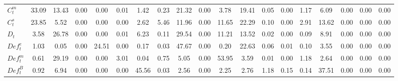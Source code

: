\begin{center}
\begin{longtable}{lcccccccccccccccccc}
$ C^m_t             $	 & 	            33.09	 & 	            13.43	 & 	             0.00	 & 	             0.00	 & 	             0.01	 & 	             1.42	 & 	             0.23	 & 	            21.32	 & 	             0.00	 & 	             3.78	 & 	            19.41	 & 	             0.05	 & 	             0.00	 & 	             1.17	 & 	             6.09	 & 	             0.00	 & 	             0.00	 & 	             0.00 \\ 
$ C^s_t             $	 & 	            23.85	 & 	             5.52	 & 	             0.00	 & 	             0.00	 & 	             0.00	 & 	             2.62	 & 	             5.46	 & 	            11.96	 & 	             0.00	 & 	            11.65	 & 	            22.29	 & 	             0.10	 & 	             0.00	 & 	             2.91	 & 	            13.62	 & 	             0.00	 & 	             0.00	 & 	             0.00 \\ 
$ D_t               $	 & 	             3.58	 & 	            26.78	 & 	             0.00	 & 	             0.00	 & 	             0.01	 & 	             6.23	 & 	             0.11	 & 	            29.54	 & 	             0.00	 & 	            11.21	 & 	            13.52	 & 	             0.02	 & 	             0.00	 & 	             0.09	 & 	             8.91	 & 	             0.00	 & 	             0.00	 & 	             0.00 \\ 
$ Def^e_t           $	 & 	             1.03	 & 	             0.05	 & 	             0.00	 & 	            24.51	 & 	             0.00	 & 	             0.17	 & 	             0.03	 & 	            47.67	 & 	             0.00	 & 	             0.20	 & 	            22.63	 & 	             0.06	 & 	             0.01	 & 	             0.10	 & 	             3.55	 & 	             0.00	 & 	             0.00	 & 	             0.00 \\ 
$ Def^m_t           $	 & 	             0.61	 & 	            29.19	 & 	             0.00	 & 	             0.00	 & 	             3.01	 & 	             0.04	 & 	             0.75	 & 	             5.05	 & 	             0.00	 & 	            53.95	 & 	             3.59	 & 	             0.01	 & 	             0.00	 & 	             1.18	 & 	             2.64	 & 	             0.00	 & 	             0.00	 & 	             0.00 \\ 
$ Def^B_t           $	 & 	             0.92	 & 	             6.94	 & 	             0.00	 & 	             0.00	 & 	             0.00	 & 	            45.56	 & 	             0.03	 & 	             2.56	 & 	             0.00	 & 	             2.25	 & 	             2.76	 & 	             1.18	 & 	             0.15	 & 	             0.14	 & 	            37.51	 & 	             0.00	 & 	             0.00	 & 	             0.00 \\ 

\end{longtable}
\end{center}
